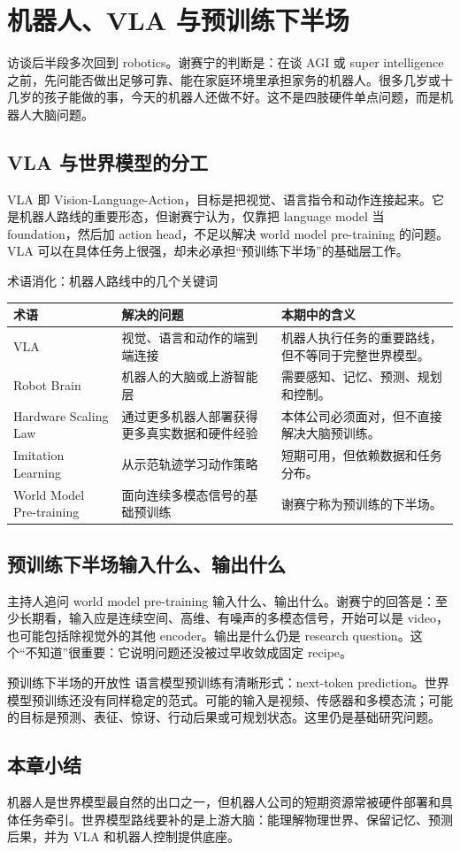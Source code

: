 \section{机器人、VLA 与预训练下半场}

访谈后半段多次回到 robotics。谢赛宁的判断是：在谈 AGI 或 super intelligence 之前，先问能否做出足够可靠、能在家庭环境里承担家务的机器人。很多几岁或十几岁的孩子能做的事，今天的机器人还做不好。这不是四肢硬件单点问题，而是机器人大脑问题。

\subsection{VLA 与世界模型的分工}

VLA 即 Vision-Language-Action，目标是把视觉、语言指令和动作连接起来。它是机器人路线的重要形态，但谢赛宁认为，仅靠把 language model 当 foundation，然后加 action head，不足以解决 world model pre-training 的问题。VLA 可以在具体任务上很强，却未必承担“预训练下半场”的基础层工作。

\begin{knowledgebox}{术语消化：机器人路线中的几个关键词}
\begin{tabularx}{\textwidth}{p{}p{}X}
\toprule
术语 & 解决的问题 & 本期中的含义 \\
\midrule
VLA & 视觉、语言和动作的端到端连接 & 机器人执行任务的重要路线，但不等同于完整世界模型。 \\
Robot Brain & 机器人的大脑或上游智能层 & 需要感知、记忆、预测、规划和控制。 \\
Hardware Scaling Law & 通过更多机器人部署获得更多真实数据和硬件经验 & 本体公司必须面对，但不直接解决大脑预训练。 \\
Imitation Learning & 从示范轨迹学习动作策略 & 短期可用，但依赖数据和任务分布。 \\
World Model Pre-training & 面向连续多模态信号的基础预训练 & 谢赛宁称为预训练的下半场。 \\
\bottomrule
\end{tabularx}
\end{knowledgebox}

\subsection{预训练下半场输入什么、输出什么}

主持人追问 world model pre-training 输入什么、输出什么。谢赛宁的回答是：至少长期看，输入应是连续空间、高维、有噪声的多模态信号，开始可以是 video，也可能包括除视觉外的其他 encoder。输出是什么仍是 research question。这个“不知道”很重要：它说明问题还没被过早收敛成固定 recipe。

\begin{importantbox}{预训练下半场的开放性}
语言模型预训练有清晰形式：next-token prediction。世界模型预训练还没有同样稳定的范式。可能的输入是视频、传感器和多模态流；可能的目标是预测、表征、惊讶、行动后果或可规划状态。这里仍是基础研究问题。
\end{importantbox}

\subsection{本章小结}

机器人是世界模型最自然的出口之一，但机器人公司的短期资源常被硬件部署和具体任务牵引。世界模型路线要补的是上游大脑：能理解物理世界、保留记忆、预测后果，并为 VLA 和机器人控制提供底座。

